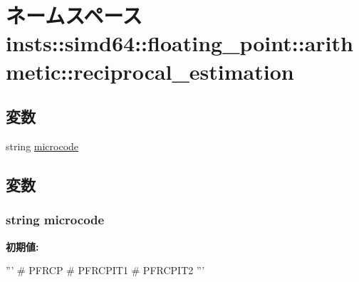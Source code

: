 \hypertarget{namespaceinsts_1_1simd64_1_1floating__point_1_1arithmetic_1_1reciprocal__estimation}{
\section{ネームスペース insts::simd64::floating\_\-point::arithmetic::reciprocal\_\-estimation}
\label{namespaceinsts_1_1simd64_1_1floating__point_1_1arithmetic_1_1reciprocal__estimation}
}
\subsection*{変数}
\begin{DoxyCompactItemize}
\item 
string \hyperlink{namespaceinsts_1_1simd64_1_1floating__point_1_1arithmetic_1_1reciprocal__estimation_a770f11a173e99389a8802f0107ed8f52}{microcode}
\end{DoxyCompactItemize}


\subsection{変数}
\hypertarget{namespaceinsts_1_1simd64_1_1floating__point_1_1arithmetic_1_1reciprocal__estimation_a770f11a173e99389a8802f0107ed8f52}{
\subsubsection[{microcode}]{\setlength{\rightskip}{0pt plus 5cm}string {\bf microcode}}}
\label{namespaceinsts_1_1simd64_1_1floating__point_1_1arithmetic_1_1reciprocal__estimation_a770f11a173e99389a8802f0107ed8f52}
{\bfseries 初期値:}
\begin{DoxyCode}
'''
# PFRCP
# PFRCPIT1
# PFRCPIT2
'''
\end{DoxyCode}

